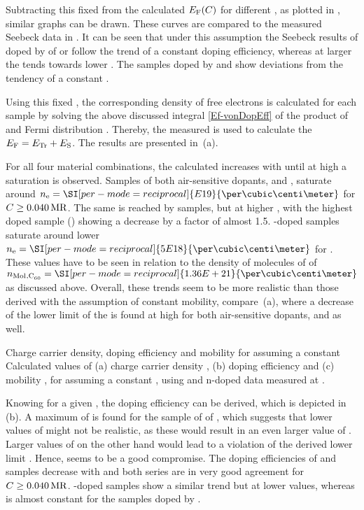 Subtracting this fixed \Et[-225] from the calculated $\Ef(\C)$ for different \DopEff, as plotted in , similar graphs can be drawn. These curves are compared to the measured Seebeck data in . It can be seen that under this assumption the Seebeck results of \CS doped by  of \WPd or \dmbi follow the trend of a constant doping efficiency, whereas at larger \C the \Es tends towards lower \DopEff. The samples doped by \CrPd and \aob show deviations from the tendency of a constant \DopEff.

Using this fixed \Et[-225], the corresponding density of free electrons \ne is calculated for each sample by solving the above discussed integral \eqref{Ef-vonDopEff} of the product of \dosLong \dos and Fermi distribution \fFD. Thereby, the measured \Es is used to calculate the \EfLong $\Ef=\Et+\Es$. The results are presented in \,(a).

For all four material combinations, the calculated \ne increases with \C until at high \C a saturation is observed. Samples of both air-sensitive dopants, \CrPd and \WPd, saturate around $\ne=\SI[per-mode=reciprocal]{E19}{\per\cubic\centi\meter}$ for \CLongs \mbox{$\C\geq\mr{0.040}$}. The same \ne is reached by \dmbi samples, but at higher \C, with the highest doped sample (\C[0.650]) showing a decrease by a factor of almost 1.5.
\aob-doped samples saturate around lower $\ne=\SI[per-mode=reciprocal]{5E18}{\per\cubic\centi\meter}$ for .
These values have to be seen in relation to the density of molecules of \CS of \mbox{$\nM{}_{\text{,C}_{60}}=\SI[per-mode=reciprocal]{1.36E+21}{\per\cubic\centi\meter}$} as discussed above.
Overall, these trends seem to be more realistic than those derived with the assumption of constant mobility, compare \,(a), where a decrease of the lower limit of the \neLong \neLL is found at high \CLong for both air-sensitive dopants, \CrPd and \WPd as well.

{Charge carrier density, doping efficiency and mobility for assuming a constant \Et}
{Calculated values of (a) charge carrier density \ne, (b) doping efficiency \DopEff and (c) mobility \mob, for assuming a constant \Et[-225], using \gausswidth[100] and n-doped \CS data measured at \T[40].}

Knowing \ne for a given \C, the doping efficiency \DopEff can be derived, which is depicted in \,(b). A maximum of \DopEff[62] is found for the sample of \C[0.0033] of \CrPd, which suggests that lower values of \Et might not be realistic, as these would result in an even larger value of \DopEff. Larger values of \Et on the other hand would lead to a violation of the derived lower limit \DopEffLL. Hence, \Et[-225] seems to be a good compromise. The doping efficiencies of \CrPd and \WPd samples decrease with \CLong and both series are in very good agreement for $\C\geq\mr{0.040}$. \aob-doped samples show a similar trend but at lower values, whereas \DopEff is almost constant for the samples doped by \dmbi.

